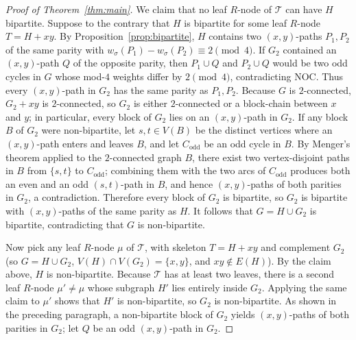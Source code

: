 \documentclass[10pt,letterpaper]{article}
\theoremstyle{zetaplain}
\theoremstyle{zetadef}
\theoremstyle{remark}
\numberwithin{equation}{section}
\begin{document}
\begin{proof}[Proof of Theorem~\ref{thm:main}]
We claim that no leaf $R$-node of $\mathcal{T}$ can have $H$ bipartite. Suppose to the contrary that $H$ is bipartite for some leaf $R$-node $T = H + xy$. By Proposition~\ref{prop:bipartite}, $H$ contains two $(x, y)$-paths $P_1, P_2$ of the same parity with $w_\sigma(P_1) - w_\sigma(P_2) \equiv 2 \pmod 4$. If $G_2$ contained an $(x, y)$-path $Q$ of the opposite parity, then $P_1 \cup Q$ and $P_2 \cup Q$ would be two odd cycles in $G$ whose mod-$4$ weights differ by $2 \pmod 4$, contradicting NOC. Thus every $(x, y)$-path in $G_2$ has the same parity as $P_1, P_2$. Because $G$ is $2$-connected, $G_2 + xy$ is $2$-connected, so $G_2$ is either $2$-connected or a block-chain between $x$ and $y$; in particular, every block of $G_2$ lies on an $(x, y)$-path in $G_2$. If any block $B$ of $G_2$ were non-bipartite, let $s, t \in V(B)$ be the distinct vertices where an $(x, y)$-path enters and leaves $B$, and let $C_{\mathrm{odd}}$ be an odd cycle in $B$. By Menger's theorem applied to the $2$-connected graph $B$, there exist two vertex-disjoint paths in $B$ from $\{s, t\}$ to $C_{\mathrm{odd}}$; combining them with the two arcs of $C_{\mathrm{odd}}$ produces both an even and an odd $(s, t)$-path in $B$, and hence $(x, y)$-paths of both parities in $G_2$, a contradiction. Therefore every block of $G_2$ is bipartite, so $G_2$ is bipartite with $(x, y)$-paths of the same parity as $H$. It follows that $G = H \cup G_2$ is bipartite, contradicting that $G$ is non-bipartite.

Now pick any leaf $R$-node $\mu$ of $\mathcal{T}$, with skeleton $T = H + xy$ and complement $G_2$ (so $G = H \cup G_2$, $V(H) \cap V(G_2) = \{x, y\}$, and $xy \notin E(H)$). By the claim above, $H$ is non-bipartite. Because $\mathcal{T}$ has at least two leaves, there is a second leaf $R$-node $\mu' \ne \mu$ whose subgraph $H'$ lies entirely inside $G_2$. Applying the same claim to $\mu'$ shows that $H'$ is non-bipartite, so $G_2$ is non-bipartite. As shown in the preceding paragraph, a non-bipartite block of $G_2$ yields $(x, y)$-paths of both parities in $G_2$; let $Q$ be an odd $(x, y)$-path in $G_2$.


\end{proof}
\end{document}
